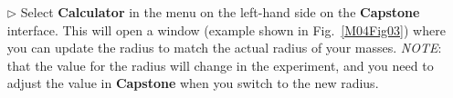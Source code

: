 \begin{itemize}
  
\item[$\triangleright$] Select \textbf{Calculator} in the menu on the left-hand side on the \textbf{Capstone} interface. This will open a window (example shown in Fig.~\ref{M04Fig03}) where you can update the radius to match the actual radius of your masses. \textit{NOTE}: that the value for the radius will change in the experiment, and you need to adjust the value in \textbf{Capstone} when you switch to the new radius.
  


\end{itemize}
